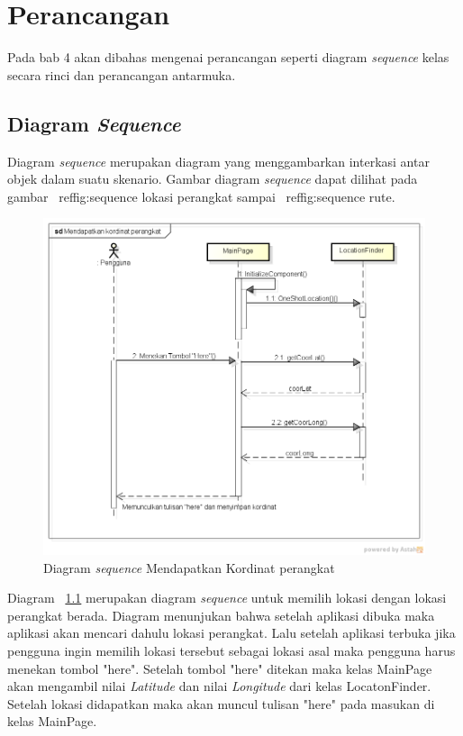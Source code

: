 \chapter{Perancangan}
\label{chap:Perancangan}

Pada bab 4 akan dibahas mengenai perancangan seperti diagram \textit{sequence} kelas secara rinci dan perancangan antarmuka.

\section{Diagram \textit{Sequence}}
\label{lab:Diagram Sequence}
\hspace{0.5cm} Diagram \textit{sequence} merupakan diagram yang menggambarkan interkasi antar objek dalam suatu skenario. Gambar diagram \textit{sequence} dapat dilihat pada gambar ~ref{fig:sequence lokasi perangkat} sampai ~ref{fig:sequence rute}. 

\begin{figure}[h]
	\centering
		\includegraphics[scale=0.4]{Gambar/sequence/MendapatkanKordinatPerangkat}
	\caption{Diagram \textit{sequence} Mendapatkan Kordinat perangkat}
	\label{fig:sequence lokasi perangkat}
\end{figure}

\hspace{0.5cm} Diagram ~\ref{fig:sequence lokasi perangkat} merupakan diagram \textit{sequence} untuk memilih lokasi dengan lokasi perangkat berada. Diagram menunjukan bahwa setelah aplikasi dibuka maka aplikasi akan mencari dahulu lokasi perangkat. Lalu setelah aplikasi terbuka jika pengguna ingin memilih lokasi tersebut sebagai lokasi asal maka pengguna harus menekan tombol "here". Setelah tombol "here" ditekan maka kelas MainPage akan mengambil nilai \textit{Latitude} dan nilai \textit{Longitude} dari kelas LocatonFinder. Setelah lokasi didapatkan maka akan muncul tulisan "here" pada masukan di kelas MainPage.

